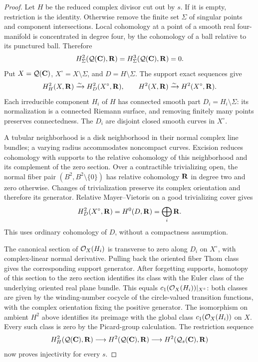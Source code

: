 \begin{proof}
Let \(H\) be the reduced complex divisor cut out by \(s\).
If it is empty, restriction is the identity.
Otherwise remove the finite set \(\Sigma\) of singular points and
component intersections.
Local cohomology at a point of a smooth real four-manifold is
concentrated in degree four, by the cohomology of a ball relative to
its punctured ball. Therefore
\[
 H^2_\Sigma(\mathcal Q(\mathbf{C}),\mathbf{R})
 =H^3_\Sigma(\mathcal Q(\mathbf{C}),\mathbf{R})=0.
\]
Put \(X=\mathcal Q(\mathbf{C})\), \(X^\circ=X\setminus\Sigma\), and
\(D=H\setminus\Sigma\). The support exact sequences give
\[
 H^2_H(X,\mathbf{R})\xrightarrow{\sim}H^2_D(X^\circ,\mathbf{R}),
 \qquad
 H^2(X,\mathbf{R})\xrightarrow{\sim}H^2(X^\circ,\mathbf{R}).
\]
Each irreducible component \(H_i\) of \(H\) has connected smooth
part \(D_i=H_i\setminus\Sigma\): its normalization is a connected
Riemann surface, and removing finitely many points preserves
connectedness. The \(D_i\) are disjoint closed smooth curves in
\(X^\circ\).

A tubular neighborhood is a disk neighborhood in their normal
complex line bundles; a varying radius accommodates noncompact
curves. Excision reduces cohomology with supports to the relative
cohomology of this neighborhood and its complement of the zero
section. Over a contractible trivializing open, the normal fiber
pair \((B^2,B^2\setminus\{0\})\) has relative cohomology
\(\mathbf{R}\) in degree two and zero otherwise.
Changes of trivialization preserve its complex orientation and
therefore its generator. Relative Mayer--Vietoris on a good
trivializing cover gives
\[
 H^2_D(X^\circ,\mathbf{R})=H^0(D,\mathbf{R})
       =\bigoplus_i\mathbf{R}.
\]
This uses ordinary cohomology of \(D\), without a compactness
assumption.

The canonical section of \(\mathcal O_X(H_i)\) is transverse to zero
along \(D_i\) on \(X^\circ\), with complex-linear normal derivative.
Pulling back the oriented fiber Thom class gives the corresponding
support generator. After forgetting supports, homotopy of this
section to the zero section identifies its class with the Euler
class of the underlying oriented real plane bundle. This equals
\(c_1(\mathcal O_X(H_i))|_{X^\circ}\): both classes are given by the
winding-number cocycle of the circle-valued transition functions,
with the complex orientation fixing the positive generator.
The isomorphism on ambient \(H^2\) above identifies its preimage
with the global class \(c_1(\mathcal O_X(H_i))\) on \(X\).
Every such class is zero by the Picard-group calculation.
The restriction sequence
\[
 H^2_H(\mathcal Q(\mathbf{C}),\mathbf{R})\longrightarrow H^2(\mathcal Q(\mathbf{C}),\mathbf{R})
 \longrightarrow H^2(\mathcal Q_s(\mathbf{C}),\mathbf{R})
\]
now proves injectivity for every \(s\).
\end{proof}

